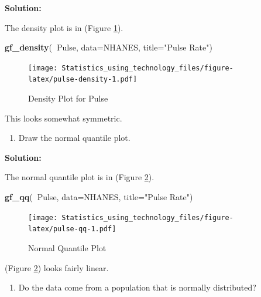 \documentclass[
]{book}
\newenvironment{Shaded}{\begin{snugshade}}{\end{snugshade}}
\newcommand{\DataTypeTok}[1]{\textcolor[rgb]{0.13,0.29,0.53}{#1}}
\newcommand{\KeywordTok}[1]{\textcolor[rgb]{0.13,0.29,0.53}{\textbf{#1}}}
\newcommand{\NormalTok}[1]{#1}
\newcommand{\OperatorTok}[1]{\textcolor[rgb]{0.81,0.36,0.00}{\textbf{#1}}}
\newcommand{\StringTok}[1]{\textcolor[rgb]{0.31,0.60,0.02}{#1}}
\providecommand{\tightlist}{%
  \setlength{\itemsep}{0pt}\setlength{\parskip}{0pt}}
\begin{document}
\textbf{Solution:}

The density plot is in (Figure \ref{fig:pulse-density}).



\begin{Shaded}
\begin{Highlighting}[]
\KeywordTok{gf_density}\NormalTok{(}\OperatorTok{~}\NormalTok{Pulse, }\DataTypeTok{data=}\NormalTok{NHANES, }\DataTypeTok{title=}\StringTok{"Pulse Rate"}\NormalTok{)}
\end{Highlighting}
\end{Shaded}

\begin{figure}
\centering
\texttt{[image: Statistics\_using\_technology\_files/figure-latex/pulse-density-1.pdf]}
\caption{\label{fig:pulse-density}Density Plot for Pulse}
\end{figure}

This looks somewhat symmetric.

\begin{enumerate}
\def\labelenumi{\alph{enumi}.}
\setcounter{enumi}{2}
\tightlist
\item
  Draw the normal quantile plot.
\end{enumerate}

\textbf{Solution:}

The normal quantile plot is in (Figure \ref{fig:pulse-qq}).



\begin{Shaded}
\begin{Highlighting}[]
\KeywordTok{gf_qq}\NormalTok{(}\OperatorTok{~}\NormalTok{Pulse, }\DataTypeTok{data=}\NormalTok{NHANES, }\DataTypeTok{title=}\StringTok{"Pulse Rate"}\NormalTok{)}
\end{Highlighting}
\end{Shaded}

\begin{figure}
\centering
\texttt{[image: Statistics\_using\_technology\_files/figure-latex/pulse-qq-1.pdf]}
\caption{\label{fig:pulse-qq}Normal Quantile Plot}
\end{figure}

(Figure \ref{fig:pulse-qq}) looks fairly linear.

\begin{enumerate}
\def\labelenumi{\alph{enumi}.}
\setcounter{enumi}{4}
\tightlist
\item
  Do the data come from a population that is normally distributed?
\end{enumerate}
\end{document}
